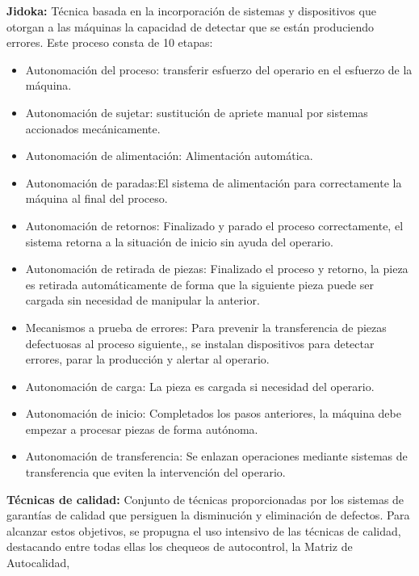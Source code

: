 \begin{description}
\item \textbf{Jidoka:} Técnica basada en la incorporación de sistemas y dispositivos que otorgan a las máquinas la capacidad de detectar que se están produciendo errores. Este proceso consta de 10 etapas:

\begin{itemize}
\item Autonomación del proceso: transferir esfuerzo del operario en el esfuerzo de la máquina.
\item Autonomación de sujetar: sustitución de apriete manual por sistemas accionados mecánicamente.
\item Autonomación de alimentación: Alimentación automática.
\item Autonomación de paradas:El sistema de alimentación para correctamente la máquina al final del proceso.
\item Autonomación de retornos: Finalizado y parado el proceso correctamente, el sistema retorna a la situación de inicio sin ayuda del operario.
\item Autonomación de retirada de piezas: Finalizado el proceso y retorno, la pieza es retirada automáticamente de forma que la siguiente pieza puede ser cargada sin necesidad de manipular la anterior.
\item Mecanismos a prueba de errores: Para prevenir la transferencia de piezas defectuosas al proceso siguiente,, se instalan dispositivos para detectar errores, parar la producción y alertar al operario.
\item Autonomación de carga: La pieza es cargada si necesidad del operario.
\item Autonomación de inicio: Completados los pasos anteriores, la máquina debe empezar a procesar piezas de forma autónoma.
\item Autonomación de transferencia: Se enlazan operaciones mediante sistemas de transferencia que eviten la intervención del operario.
\end{itemize}

\item \textbf{Técnicas de calidad:} Conjunto de técnicas proporcionadas por los sistemas de garantías de calidad que persiguen la disminución y eliminación de defectos. Para alcanzar estos objetivos, se propugna el uso intensivo de las técnicas de calidad, destacando entre todas ellas los chequeos de autocontrol, la Matriz de Autocalidad,

\end{description}

